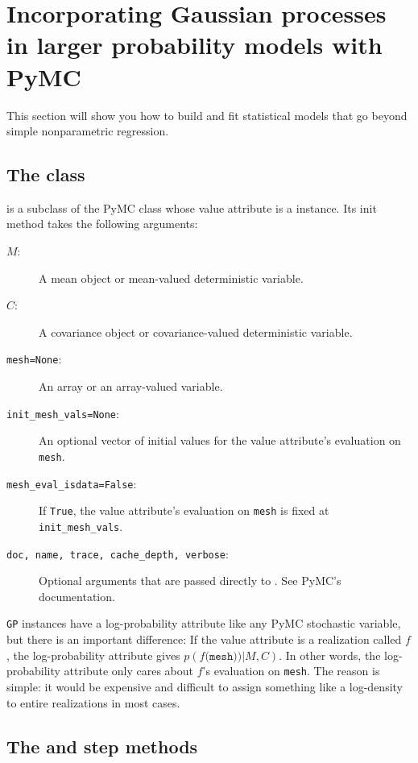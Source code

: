 \documentclass[]{manual}
\begin{document}
\section{Incorporating Gaussian processes in larger probability models with PyMC}\label{sec:PyMC}

This section will show you how to build and fit statistical models that go beyond simple nonparametric regression.

\subsection{The  class}
 is a subclass of the PyMC  class whose value attribute is a  instance. Its init method takes the following arguments:
\begin{description}
    \item[$M$:] A mean object or mean-valued deterministic variable.
    \item[$C$:] A covariance object or covariance-valued deterministic variable.
    \item[\texttt{mesh=None}:] An array or an array-valued variable.
    \item[\texttt{init_mesh_vals=None}:] An optional vector of initial values for the value attribute's evaluation on \texttt{mesh}.
    \item[\texttt{mesh_eval_isdata=False}:] If \texttt{True}, the value attribute's evaluation on \texttt{mesh} is fixed at \texttt{init_mesh_vals}.
    \item[\texttt{doc, name, trace, cache_depth, verbose}:] Optional arguments that are passed directly to . See PyMC's documentation.
\end{description}

\texttt{GP} instances have a log-probability attribute like any PyMC stochastic variable, but there is an important difference: If the value attribute is a realization called $f$, the log-probability attribute gives $p(f\texttt{(mesh))}|M,C)$. In other words, the log-probability attribute only cares about $f$'s evaluation on \texttt{mesh}. The reason is simple: it would be expensive and difficult to assign something like a log-density to entire realizations in most cases.

\subsection{The  and  step methods}
\end{document}
